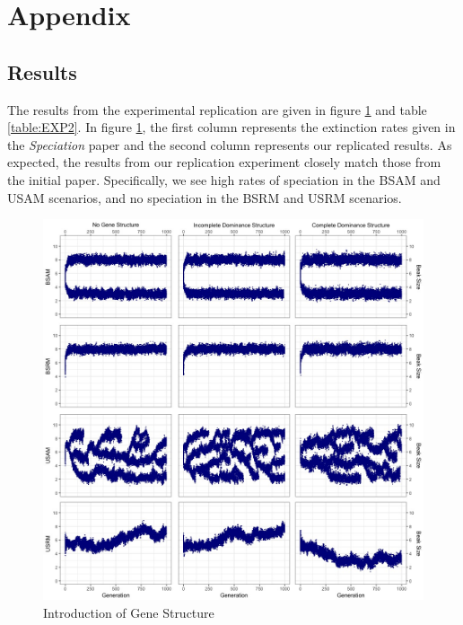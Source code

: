 \documentclass{article}
\begin{document}
\newpage

\section{Appendix}

\subsection{Results}

The results from the experimental replication are given in figure \ref{fig:EXP2} and table \ref{table:EXP2}. In figure \ref{fig:EXP2}, the first column represents the extinction rates given in the \textit{Speciation} paper and the second column represents our replicated results. As expected, the results from our replication experiment closely match those from the initial paper. Specifically, we see high rates of speciation in the BSAM and USAM scenarios, and no speciation in the BSRM and USRM scenarios.

\begin{figure}
    \centering
    \includegraphics[width=\linewidth]{Data/EXP2}
    \caption{Introduction of Gene Structure}
    \label{fig:EXP2}
\end{figure}
\end{document}
